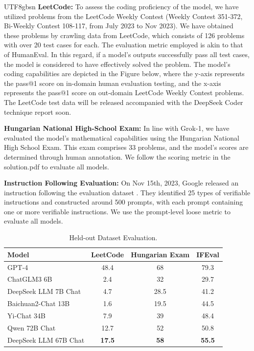\documentclass[11pt, a4paper, logo, copyright, nonumbering]{deepseek}
\begin{document}
\begin{CJK*}{UTF8}{gbsn}
\textbf{LeetCode: }To assess the coding proficiency of the model, we have utilized problems from the LeetCode Weekly Contest (Weekly Contest 351-372, Bi-Weekly Contest 108-117, from July 2023 to Nov 2023). We have obtained these problems by crawling data from LeetCode, which consists of 126 problems with over 20 test cases for each. The evaluation metric employed is akin to that of HumanEval. In this regard, if a model's outputs successfully pass all test cases, the model is considered to have effectively solved the problem. The model's coding capabilities are depicted in the Figure below, where the y-axis represents the pass@1 score on in-domain human evaluation testing, and the x-axis represents the pass@1 score on out-domain LeetCode Weekly Contest problems. The LeetCode test data will be released accompanied with the DeepSeek Coder technique report soon. 

\textbf{Hungarian National High-School Exam:} In line with Grok-1, we have evaluated the model's mathematical capabilities using the Hungarian National High School Exam. This exam comprises 33 problems, and the model's scores are determined through human annotation. We follow the scoring metric in the solution.pdf to evaluate all models.

\textbf{Instruction Following Evaluation: } On Nov 15th, 2023, Google released an instruction following the evaluation dataset \citep{IFeval}. They identified 25 types of verifiable instructions and constructed around 500 prompts, with each prompt containing one or more verifiable instructions. We use the prompt-level loose metric to evaluate all models. 

\begin{table}[h]
\centering \small
\begin{tabular}{lccc}
	\toprule
Model & LeetCode & Hungarian Exam & IFEval   \\ \midrule
GPT-4 & 48.4 & 68 & 79.3 \\ \midrule
ChatGLM3 6B & 2.4 & 32 & 29.7 \\ 
DeepSeek LLM 7B Chat & 4.7 & 28.5 & 41.2\\ 
Baichuan2-Chat 13B & 1.6& 19.5 &44.5 \\ 
Yi-Chat 34B & 7.9& 39& 48.4 \\ 
Qwen 72B Chat & 12.7 & 52 & 50.8 \\ 
DeepSeek LLM 67B Chat & \textbf{17.5} & \textbf{58} & \textbf{55.5}\\   
\bottomrule
\end{tabular}
\caption{\centering Held-out Dataset Evaluation.}
\label{table:heldout}
\end{table}


\end{CJK*}
\end{document}
